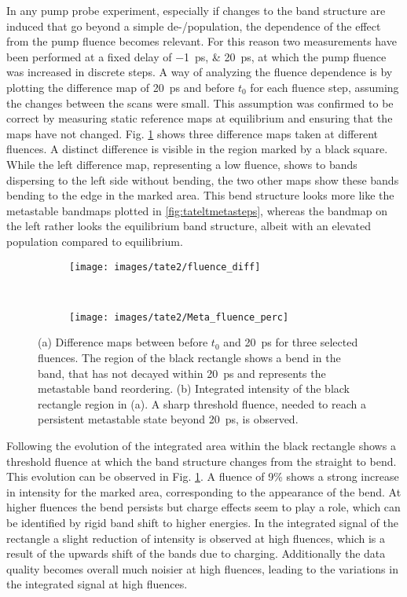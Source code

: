 In any pump probe experiment, especially if changes to the band structure are induced that go beyond a simple de-/population, the dependence of the effect from the pump fluence becomes relevant.
For this reason two measurements have been performed at a fixed delay of \qtylist{-1; 20}{\pico\second}, at which the pump fluence was increased in discrete steps.
A way of analyzing the fluence dependence is by plotting the difference map of \qty{20}{\pico\second} and before $t_0$ for each fluence step, assuming the changes between the scans were small.
This assumption was confirmed to be correct by measuring static reference maps at equilibrium and ensuring that the maps have not changed.
Fig. \ref{fig:tate_fluence} shows three difference maps taken at different fluences.
A distinct difference is visible in the region marked by a black square.
While the left difference map, representing a low fluence, shows to bands dispersing to the left side without bending, the two other maps show these bands bending to the edge in the marked area.
This bend structure looks more like the metastable bandmaps plotted in \ref{fig:tateltmetasteps}, whereas the bandmap on the left rather looks the equilibrium band structure, albeit with an elevated population compared to equilibrium.


\begin{figure}[t!]
	\centering
	\begin{subfigure}[b]{0.66\textwidth}
		\texttt{[image: images/tate2/fluence\_diff]}
		\caption{}
	\end{subfigure}
	\\
	\begin{subfigure}[b]{0.33\textwidth}
		\texttt{[image: images/tate2/Meta\_fluence\_perc]}
		\caption{}
	\end{subfigure}
	\caption{(a) Difference maps between before $t_0$ and \qty{20}{\pico\second} for three selected fluences. The region of the black rectangle shows a bend in the band, that has not decayed within \qty{20}{\pico\second} and represents the metastable band reordering. (b) Integrated intensity of the black rectangle region in (a). A sharp threshold fluence, needed to reach a persistent metastable state beyond \qty{20}{\pico\second}, is observed.}
	\label{fig:tate_fluence}
\end{figure}

Following the evolution of the integrated area within the black rectangle shows a threshold fluence at which the band structure changes from the straight to bend.
This evolution can be observed in Fig. \ref{fig:tate_fluence}.
A fluence of 9\% shows a strong increase in intensity for the marked area, corresponding to the appearance of the bend.
At higher fluences the bend persists but charge effects seem to play a role, which can be identified by rigid band shift to higher energies.
In the integrated signal of the rectangle a slight reduction of intensity is observed at high fluences, which is a result of the upwards shift of the bands due to charging.
Additionally the data quality becomes overall much noisier at high fluences, leading to the variations in the integrated signal at high fluences.


